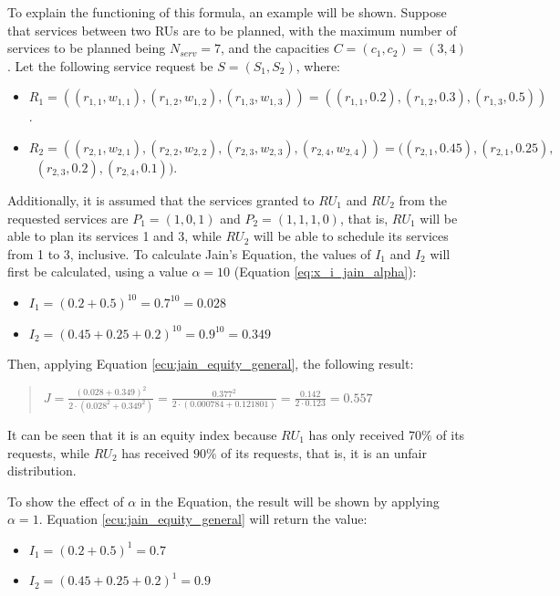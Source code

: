 \documentclass[preprint,12pt]{elsarticle}
\begin{document}
To explain the functioning of this formula, an example will be shown. Suppose that services between two RUs are to be planned, with the maximum number of services to be planned being $N_{serv} = 7$, and the capacities $C = (c_1, c_2) = (3,4)$. Let the following service request be $S = (S_1,S_2)$, where:
\begin{itemize}
    \item $R_1 = ( (r_{1,1},w_{1,1}),(r_{1,2},w_{1,2}),(r_{1,3},w_{1,3})) = ( (r_{1,1},0.2),(r_{1,2},0.3),(r_{1,3},0.5))$.
    \item $R_2 = ( (r_{2,1},w_{2,1}),(r_{2,2},w_{2,2}),(r_{2,3},w_{2,3}),(r_{2,4},w_{2,4})) = ( (r_{2,1},0.45),(r_{2,1},0.25),$ \ 
    $(r_{2,3},0.2),(r_{2,4},0.1))$.
\end{itemize}


Additionally, it is assumed that the services granted to $RU_1$ and $RU_2$ from the requested services are $P_1 = (1,0,1)$ and $P_2 = (1,1,1,0)$, that is, $RU_1$ will be able to plan its services 1 and 3, while $RU_2$ will be able to schedule its services from 1 to 3, inclusive. To calculate Jain's Equation, the values of $I_1$ and $I_2$ will first be calculated, using a value $\alpha=10$ (Equation \ref{eq:x_i_jain_alpha}):
\begin{itemize}
    \item $I_1 = (0.2+0.5)^{10} = 0.7^{10} = 0.028$
    \item $I_2 = (0.45+0.25+0.2)^{10} = 0.9^{10} = 0.349$
\end{itemize}


Then, applying Equation \ref{ecu:jain_equity_general}, the following result:

\begin{quote}
    $ J = \frac{(0.028+0.349)^2}{2 \cdot (0.028^2+0.349^2)}= \frac{0.377^2}{2 \cdot (0.000784+0.121801)} = \frac{0.142}{2\cdot0.123} = 0.557 $
\end{quote}


It can be seen that it is an equity index because $RU_1$ has only received $70\%$ of its requests, while $RU_2$ has received $90\%$ of its requests, that is, it is an unfair distribution.

To show the effect of $\alpha$ in the Equation, the result will be shown by applying $\alpha=1$. Equation \ref{ecu:jain_equity_general} will return the value:
\begin{itemize}
    \item $I_1 = (0.2+0.5)^{1} = 0.7$
    \item $I_2 = (0.45+0.25+0.2)^{1} = 0.9$
\end{itemize}
\end{document}
